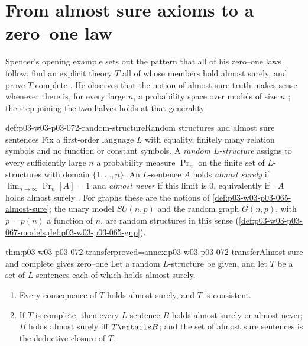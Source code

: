 \section{From almost sure axioms to a zero--one law}
\label{sec:p03-w03-p03-072-transfer}

Spencer's opening example sets out the pattern that all of his zero--one
laws follow: find an explicit theory \(T\) all of whose members hold almost
surely, and prove \(T\) complete
\cite[p.~3]{Spencer2007LogicRandomStructuresAuthor}.  He observes that the
notion of almost sure truth makes sense whenever there is, for every large
\(n\), a probability space over models of size \(n\)
\cite[p.~2]{Spencer2007LogicRandomStructuresAuthor}; the step joining the
two halves holds at that generality.

\begin{hbconvention}{def:p03-w03-p03-072-random-structure}{Random structures and almost sure sentences}
Fix a first-order language \(L\) with equality, finitely many relation
symbols and no function or constant symbols.  A \emph{random
\(L\)-structure} assigns to every sufficiently large \(n\) a probability
measure \(\Pr_n\) on the finite set of \(L\)-structures with domain
\(\{1,\ldots,n\}\).  An \(L\)-sentence \(A\) holds \emph{almost surely} if
\(\lim_{n\to\infty}\Pr_n[A]=1\) and \emph{almost never} if this limit is
\(0\), equivalently if \(\neg A\) holds almost surely
\cite[p.~2]{Spencer2007LogicRandomStructuresAuthor}.  For graphs these are
the notions of \cref{def:p03-w03-p03-065-almost-sure}; the unary model
\(SU(n,p)\) and the random graph \(G(n,p)\), with \(p=p(n)\) a function of
\(n\), are random structures in this sense
(\cref{def:p03-w03-p03-067-models,def:p03-w03-p03-065-gnp}).
\end{hbconvention}

\begin{hbtheorem}{thm:p03-w03-p03-072-transfer}{proved=annex:p03-w03-p03-072-transfer}{Almost sure and complete gives zero--one}
Let a random \(L\)-structure be given, and let \(T\) be a set of
\(L\)-sentences each of which holds almost surely.
\begin{enumerate}
\item Every consequence of \(T\) holds almost surely, and \(T\) is
  consistent.
\item If \(T\) is complete, then every \(L\)-sentence \(B\) holds almost
  surely or almost never; \(B\) holds almost surely iff \(T\entails B\); and
  the set of almost sure sentences is the deductive closure of \(T\).
\end{enumerate}
\end{hbtheorem}

